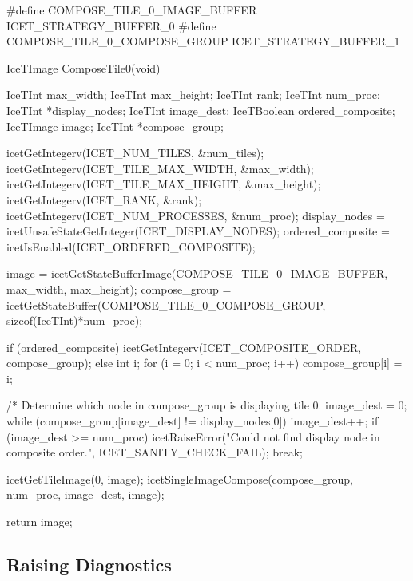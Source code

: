 \begin{code}
#define COMPOSE_TILE_0_IMAGE_BUFFER     ICET_STRATEGY_BUFFER_0
#define COMPOSE_TILE_0_COMPOSE_GROUP    ICET_STRATEGY_BUFFER_1

IceTImage ComposeTile0(void)
{
  IceTInt max_width;
  IceTInt max_height;
  IceTInt rank;
  IceTInt num_proc;
  IceTInt *display_nodes;
  IceTInt image_dest;
  IceTBoolean ordered_composite;
  IceTImage image;
  IceTInt *compose_group;

  icetGetIntegerv(ICET_NUM_TILES, &num_tiles);
  icetGetIntegerv(ICET_TILE_MAX_WIDTH, &max_width);
  icetGetIntegerv(ICET_TILE_MAX_HEIGHT, &max_height);
  icetGetIntegerv(ICET_RANK, &rank);
  icetGetIntegerv(ICET_NUM_PROCESSES, &num_proc);
  display_nodes = icetUnsafeStateGetInteger(ICET_DISPLAY_NODES);
  ordered_composite = icetIsEnabled(ICET_ORDERED_COMPOSITE);

  image = icetGetStateBufferImage(COMPOSE_TILE_0_IMAGE_BUFFER,
                                  max_width, max_height);
  compose_group = icetGetStateBuffer(COMPOSE_TILE_0_COMPOSE_GROUP,
                                     sizeof(IceTInt)*num_proc);

  if (ordered_composite) {
    icetGetIntegerv(ICET_COMPOSITE_ORDER, compose_group);
  } else {
    int i;
    for (i = 0; i < num_proc; i++) {
      compose_group[i] = i;
    }
  }

  /* Determine which node in compose_group is displaying tile 0.
  image_dest = 0;
  while (compose_group[image_dest] != display_nodes[0]) {
    image_dest++;
    if (image_dest >= num_proc) {
      icetRaiseError("Could not find display node in composite order.",
                     ICET_SANITY_CHECK_FAIL);
      break;
    }
  }

  icetGetTileImage(0, image);
  icetSingleImageCompose(compose_group, num_proc, image_dest, image);

  return image;
}
\end{code}

\subsection{Raising Diagnostics}

